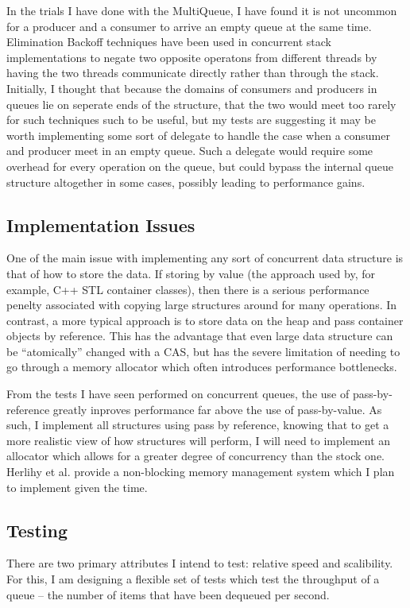 \documentclass[12pt]{report}
\begin{document}
In the trials I have done with the MultiQueue, I have found it is not uncommon
for a producer and a consumer to arrive an empty queue at the same time.
Elimination Backoff techniques have been used in concurrent stack
implementations to negate two opposite operatons from different threads by
having the two threads communicate directly rather than through the stack.
Initially, I thought that because the domains of consumers and producers in
queues lie on seperate ends of the structure, that the two would meet too
rarely for such techniques such to be useful, but my tests are suggesting it
may be worth implementing some sort of delegate to handle the case when a
consumer and producer meet in an empty queue. Such a delegate would require
some overhead for every operation on the queue, but could bypass the internal
queue structure altogether in some cases, possibly leading to performance
gains.

\subsection{Implementation Issues}
One of the main issue with implementing any sort of concurrent data structure
is that of how to store the data. If storing by value (the approach used by,
for example, C++ STL container classes), then there is a serious performance
penelty associated with copying large structures around for many operations. In
contrast, a more typical approach is to store data on the heap and pass
container objects by reference. This has the advantage that even large data
structure can be ``atomically'' changed with a CAS, but has the severe
limitation of needing to go through a memory allocator which often introduces
performance bottlenecks.

From the tests I have seen performed on concurrent queues, the use of
pass-by-reference greatly inproves performance far above the use of
pass-by-value.\cite{suttertest}  As such, I implement all structures using pass
by reference, knowing that to get a more realistic view of how structures will
perform, I will need to implement an allocator which allows for a greater
degree of concurrency than the stock one. Herlihy et al. provide a non-blocking
memory management system which I plan to implement given the
time.\cite{herlihy2005}

\subsection{Testing}
There are two primary attributes I intend to test: relative speed and
scalibility. For this, I am designing a flexible set of tests which test the
throughput of a queue -- the number of items that have been dequeued per
second.
\end{document}

